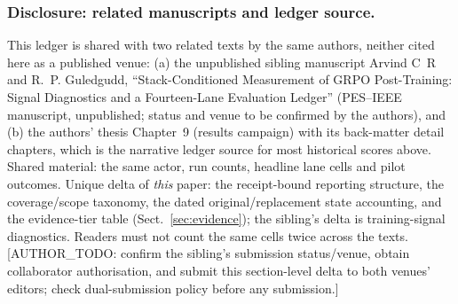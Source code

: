 \documentclass[a4paper,runningheads]{llncs}
\begin{document}
\subsubsection{Disclosure: related manuscripts and ledger source.}
This ledger is shared with two related texts by the same authors, neither
cited here as a published venue: (a) the unpublished sibling manuscript
Arvind C~R and R.~P. Guledgudd, ``Stack-Conditioned Measurement of GRPO
Post-Training: Signal Diagnostics and a Fourteen-Lane Evaluation Ledger''
(PES--IEEE manuscript, unpublished; status and venue to be confirmed by the
authors), and (b) the authors' thesis Chapter~9 (results campaign) with its
back-matter detail chapters, which is the narrative ledger source for most
historical scores above. Shared material: the same actor, run counts,
headline lane cells and pilot outcomes. Unique delta of \emph{this} paper:
the receipt-bound reporting structure, the coverage/scope taxonomy, the
dated original/replacement state accounting, and the evidence-tier table
(Sect.~\ref{sec:evidence}); the sibling's delta is training-signal
diagnostics. Readers must not count the same cells twice across the texts.
[AUTHOR\_TODO: confirm the sibling's submission status/venue, obtain
collaborator authorisation, and submit this section-level delta to both
venues' editors; check dual-submission policy before any submission.]
\end{document}
